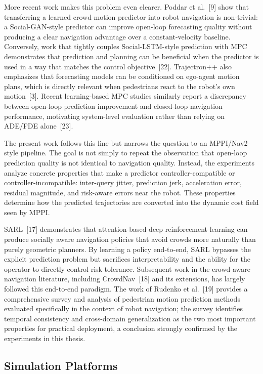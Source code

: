 \documentclass[12pt, a4paper]{article}
\begin{document}
More recent work makes this problem even clearer. Poddar et al.~[9] show that transferring a learned crowd motion predictor into robot navigation is non-trivial: a Social-GAN-style predictor can improve open-loop forecasting quality without producing a clear navigation advantage over a constant-velocity baseline. Conversely, work that tightly couples Social-LSTM-style prediction with MPC demonstrates that prediction and planning can be beneficial when the predictor is used in a way that matches the control objective~[22]. Trajectron++ also emphasizes that forecasting models can be conditioned on ego-agent motion plans, which is directly relevant when pedestrians react to the robot's own motion~[3]. Recent learning-based MPC studies similarly report a discrepancy between open-loop prediction improvement and closed-loop navigation performance, motivating system-level evaluation rather than relying on ADE/FDE alone~[23].

The present work follows this line but narrows the question to an MPPI/Nav2-style pipeline. The goal is not simply to repeat the observation that open-loop prediction quality is not identical to navigation quality. Instead, the experiments analyze concrete properties that make a predictor controller-compatible or controller-incompatible: inter-query jitter, prediction jerk, acceleration error, residual magnitude, and risk-aware errors near the robot. These properties determine how the predicted trajectories are converted into the dynamic cost field seen by MPPI.

SARL~[17] demonstrates that attention-based deep reinforcement learning can produce socially aware navigation policies that avoid crowds more naturally than purely geometric planners. By learning a policy end-to-end, SARL bypasses the explicit prediction problem but sacrifices interpretability and the ability for the operator to directly control risk tolerance. Subsequent work in the crowd-aware navigation literature, including CrowdNav~[18] and its extensions, has largely followed this end-to-end paradigm. The work of Rudenko et al.~[19] provides a comprehensive survey and analysis of pedestrian motion prediction methods evaluated specifically in the context of robot navigation; the survey identifies temporal consistency and cross-domain generalization as the two most important properties for practical deployment, a conclusion strongly confirmed by the experiments in this thesis.

\subsection{Simulation Platforms}
\end{document}
